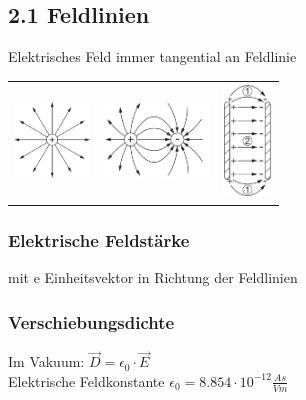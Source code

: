 \subsection{2.1 Feldlinien}
    Elektrisches Feld immer tangential an Feldlinie
    \begin{tabular}{c c c}
        \includegraphics[height = 20mm]{src/images/punktladung.png} & \includegraphics[height = 20mm]{src/images/zwei_punktladung.png} & \includegraphics[height = 30mm]{src/images/kondensator.png}
    \end{tabular}

    \subsubsection*{Elektrische Feldstärke}
         mit e Einheitsvektor in Richtung der Feldlinien

    \subsubsection*{Verschiebungsdichte}
        Im Vakuum: $\overrightarrow{D} = \epsilon_0 \cdot \overrightarrow{E}$\\
        Elektrische Feldkonstante $\epsilon_0 = 8.854 \cdot 10^{-12} \frac{As}{Vm}$